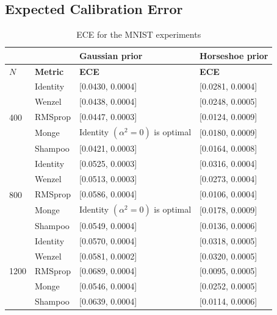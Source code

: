 \documentclass[10pt]{article} %
\theoremstyle{plain}
\theoremstyle{definition}
\theoremstyle{remark}
\begin{document}
\subsection{Expected Calibration Error}
\label{app:ECE}

\begin{table}[t]
\begin{center}
\begin{tabular}{ll|l|l}
 & & Gaussian prior &
 Horseshoe prior \\
\hline
$N$ & {\bf Metric}                   & {\bf ECE}
& {\bf ECE} \\
\hline
\multirow{5}{1em}{400} & 
Identity & [0.0430, 0.0004] & [0.0281, 0.0004] \\
& Wenzel  & [0.0438, 0.0004] & [0.0248, 0.0005] \\
& RMSprop & [0.0447, 0.0003] & [0.0124, 0.0009] \\
& Monge   
& Identity $(\alpha^{2}=0)$ is optimal & [0.0180, 0.0009] \\
& Shampoo & [0.0421, 0.0003] & [0.0164, 0.0008] \\
\hline
\multirow{5}{1em}{800} & 
Identity & [0.0525, 0.0003] & [0.0316, 0.0004] \\
& Wenzel  & [0.0513, 0.0003] & [0.0273, 0.0004] \\
& RMSprop & [0.0586, 0.0004] & [0.0106, 0.0004] \\
& Monge   & Identity $(\alpha^{2}=0)$ is optimal & [0.0178, 0.0009] \\
& Shampoo & [0.0549, 0.0004] & [0.0136, 0.0006] \\
\hline
\multirow{5}{1em}{1200} & 
Identity & [0.0570, 0.0004] & [0.0318, 0.0005] \\
& Wenzel & [0.0581, 0.0002] & [0.0320, 0.0005] \\
& RMSprop & [0.0689, 0.0004] & [0.0095, 0.0005] \\
& Monge   & [0.0546, 0.0004] & [0.0252, 0.0005] \\
& Shampoo & [0.0639, 0.0004] & [0.0114, 0.0006] \\
\hline
\end{tabular}
\caption{ECE for the MNIST experiments}
\label{table:mnisteces}
\end{center}
\end{table}
\end{document}

